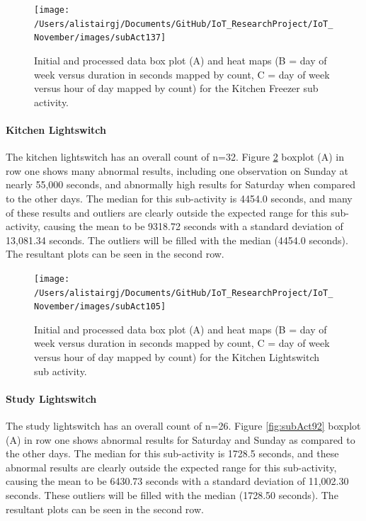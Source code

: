 \documentclass[11pt,]{article}
\let\oldparagraph\paragraph
\renewcommand{\paragraph}[1]{\oldparagraph{#1}\mbox{}}
\begin{document}
\begin{figure}[H]

{\centering \texttt{[image: /Users/alistairgj/Documents/GitHub/IoT\_ResearchProject/IoT\_November/images/subAct137]} 

}

\caption{Initial and processed data box plot (A) and heat maps (B = day of week versus duration in seconds mapped by count, C = day of week versus hour of day mapped by count) for the Kitchen Freezer sub activity.}\label{fig:subAct137}
\end{figure}

\hypertarget{kitchen-lightswitch}{%
\paragraph{Kitchen Lightswitch}\label{kitchen-lightswitch}}

The kitchen lightswitch has an overall count of n=32. Figure
\ref{fig:subAct105} boxplot (A) in row one shows many abnormal results,
including one observation on Sunday at nearly 55,000 seconds, and
abnormally high results for Saturday when compared to the other days.
The median for this sub-activity is 4454.0 seconds, and many of these
results and outliers are clearly outside the expected range for this
sub-activity, causing the mean to be 9318.72 seconds with a standard
deviation of 13,081.34 seconds. The outliers will be filled with the
median (4454.0 seconds). The resultant plots can be seen in the second
row.

\begin{figure}[H]

{\centering \texttt{[image: /Users/alistairgj/Documents/GitHub/IoT\_ResearchProject/IoT\_November/images/subAct105]} 

}

\caption{Initial and processed data box plot (A) and heat maps (B = day of week versus duration in seconds mapped by count, C = day of week versus hour of day mapped by count) for the Kitchen Lightswitch sub activity.}\label{fig:subAct105}
\end{figure}

\hypertarget{study-lightswitch}{%
\paragraph{Study Lightswitch}\label{study-lightswitch}}

The study lightswitch has an overall count of n=26. Figure
\ref{fig:subAct92} boxplot (A) in row one shows abnormal results for
Saturday and Sunday as compared to the other days. The median for this
sub-activity is 1728.5 seconds, and these abnormal results are clearly
outside the expected range for this sub-activity, causing the mean to be
6430.73 seconds with a standard deviation of 11,002.30 seconds. These
outliers will be filled with the median (1728.50 seconds). The resultant
plots can be seen in the second row.
\end{document}
